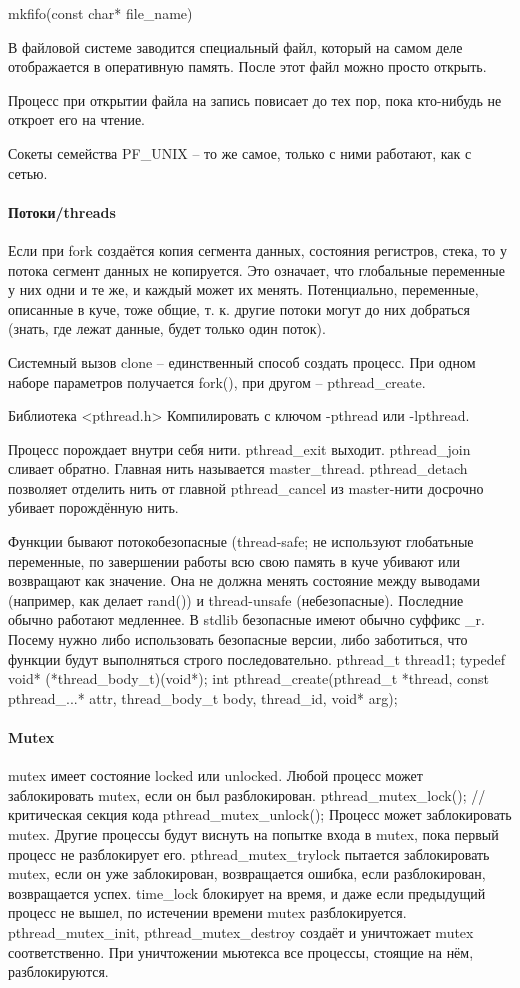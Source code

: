 \documentclass[a4paper,10pt]{article}
\begin{document}
mkfifo(const char* file\_name)

В файловой системе заводится специальный файл, который на самом деле отображается в оперативную память. После этот файл можно просто открыть.

Процесс при открытии файла на запись повисает до тех пор, пока кто-нибудь не откроет его на чтение.

Сокеты семейства PF\_UNIX -- то же самое, только с ними работают, как с сетью.

\paragraph{Потоки/threads}
Если при fork создаётся копия сегмента данных, состояния регистров, стека, то у потока сегмент данных не копируется. Это означает, что глобальные переменные у них одни и те же, и каждый может их менять. Потенциально, переменные, описанные в куче, тоже общие, т. к. другие потоки могут до них добраться (знать, где лежат данные, будет только один поток).

Системный вызов clone -- единственный способ создать процесс. При одном наборе параметров получается fork(), при другом -- pthread\_create.

Библиотека <pthread.h>
Компилировать с ключом -pthread или -lpthread.

Процесс порождает внутри себя нити. pthread\_exit выходит. pthread\_join сливает обратно. 
Главная нить называется master\_thread. pthread\_detach позволяет отделить нить от главной 
pthread\_cancel из master-нити досрочно убивает порождённую нить.

Функции бывают потокобезопасные (thread-safe; не используют глобатьные переменные, по завершении работы всю свою память в куче убивают или возвращают как значение. Она не должна менять состояние между выводами (например, как делает rand()) и thread-unsafe (небезопасные). Последние обычно работают медленнее. В stdlib безопасные имеют обычно суффикс \_r.
Посему нужно либо использовать безопасные версии, либо заботиться, что функции будут выполняться строго последовательно.
pthread\_t thread1;
typedef void* (*thread\_body\_t)(void*);
int pthread\_create(pthread\_t *thread, const pthread\_...* attr, thread\_body\_t body, thread\_id, void* arg);

\paragraph{Mutex}
mutex имеет состояние locked или unlocked.
Любой процесс может заблокировать mutex, если он был разблокирован.
pthread\_mutex\_lock();
// критическая секция кода
pthread\_mutex\_unlock();
Процесс может заблокировать mutex. Другие процессы будут виснуть на попытке входа в mutex, пока первый процесс не разблокирует его.
pthread\_mutex\_trylock пытается заблокировать mutex, если он уже заблокирован, возвращается ошибка, если разблокирован, возвращается успех.
time\_lock блокирует на время, и даже если предыдущий процесс не вышел, по истечении времени mutex разблокируется.
pthread\_mutex\_init, pthread\_mutex\_destroy создаёт и уничтожает mutex соответственно. При уничтожении мьютекса все процессы, стоящие на нём, разблокируются.
\end{document}
